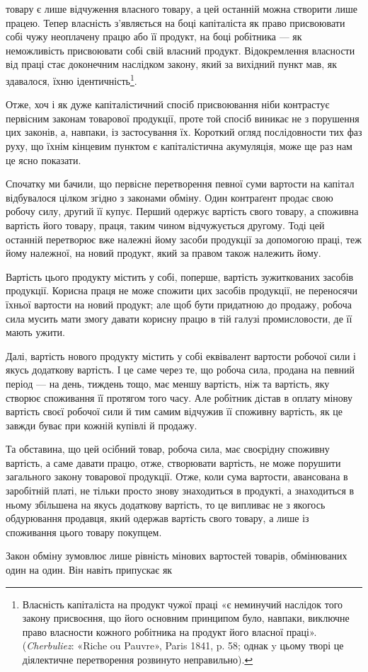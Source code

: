 \parcont{}  %
товару є лише відчуження власного товару, а цей останній можна
створити лише працею. Тепер власність з’являється на боці
капіталіста як право присвоювати собі чужу неоплачену працю
або її продукт, на боці робітника — як неможливість присвоювати
собі свій власний продукт. Відокремлення власности від
праці стає доконечним наслідком закону, який за вихідний пункт
мав, як здавалося, їхню ідентичність\footnote{
Власність капіталіста на продукт чужої праці «є неминучий
наслідок того закону присвоєння, що його основним принципом було,
навпаки, виключне право власности кожного робітника на продукт його
власної праці». (\emph{Cherbuliez}: «Riche ou Pauvre», Paris 1841, p. 58; однак
y цьому творі це діялектичне перетворення розвинуто неправильно).
}.

\label{original-496}Отже, хоч і як дуже капіталістичний спосіб присвоювання
ніби контрастує первісним законам товарової продукції, проте
той спосіб виникає не з порушення цих законів, а, навпаки, із застосування
їх. Короткий огляд послідовности тих фаз руху, що
їхнім кінцевим пунктом є капіталістична акумуляція, може ще
раз нам це ясно показати.

Спочатку ми бачили, що первісне перетворення певної суми
вартости на капітал відбувалося цілком згідно з законами обміну.
Один контраґент продає свою робочу силу, другий її купує.
Перший одержує вартість свого товару, а споживна вартість
його товару, праця, таким чином відчужується другому. Тоді
цей останній перетворює вже належні йому засоби продукції
за допомогою праці, теж йому належної, на новий продукт, який
за правом також належить йому.

Вартість цього продукту містить у собі, поперше, вартість
зужиткованих засобів продукції. Корисна праця не може спожити
цих засобів продукції, не переносячи їхньої вартости на
новий продукт; але щоб бути придатною до продажу, робоча
сила мусить мати змогу давати корисну працю в тій галузі промисловости,
де її мають ужити.

Далі, вартість нового продукту містить у собі еквівалент
вартости робочої сили і якусь додаткову вартість. І це саме через
те, що робоча сила, продана на певний період — на день, тиждень
тощо, має меншу вартість, ніж та вартість, яку створює споживання
її протягом того часу. Але робітник дістав в оплату мінову
вартість своєї робочої сили й тим самим відчужив її споживну
вартість, як це завжди буває при кожній купівлі й продажу.

Та обставина, що цей осібний товар, робоча сила, має своєрідну
споживну вартість, а саме давати працю, отже, створювати
вартість, не може порушити загального закону товарової продукції.
Отже, коли сума вартости, авансована в заробітній платі, не
тільки просто знову знаходиться в продукті, а знаходиться в
ньому збільшена на якусь додаткову вартість, то це випливає
не з якогось обдурювання продавця, який одержав вартість
свого товару, а лише із споживання цього товару покупцем.

Закон обміну зумовлює лише рівність мінових вартостей
товарів, обмінюваних один на один. Він навіть припускає як
\parbreak{}  %
